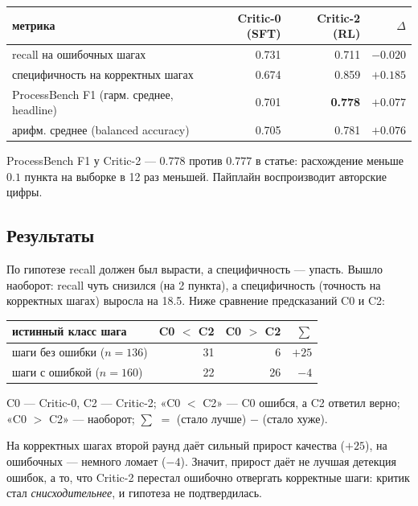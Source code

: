 \documentclass[11pt,a4paper]{article}
\begin{document}
\begin{center}
\begin{tabular}{lrrr}
\toprule
метрика & Critic-0 (SFT) & Critic-2 (RL) & $\Delta$ \\
\midrule
recall на ошибочных шагах             & 0.731 & 0.711          & $-0.020$ \\
специфичность на корректных шагах     & 0.674 & 0.859          & $+0.185$ \\
ProcessBench F1 (гарм. среднее, headline) & 0.701 & \textbf{0.778} & $+0.077$ \\
арифм. среднее (balanced accuracy)    & 0.705 & 0.781          & $+0.076$ \\
\bottomrule
\end{tabular}
\end{center}

ProcessBench F1 у Critic-2 — $0.778$ против $0.777$ в статье: расхождение меньше $0.1$ пункта на выборке в 12 раз меньшей. Пайплайн воспроизводит авторские цифры.

\subsection*{Результаты}

По гипотезе recall должен был вырасти, а специфичность — упасть. Вышло наоборот: recall чуть снизился (на 2 пункта), а специфичность (точность на корректных шагах) выросла на 18.5. Ниже сравнение предсказаний C0 и C2:

\begin{center}
\begin{tabular}{lrrr}
\toprule
истинный класс шага & C0 $<$ C2 & C0 $>$ C2 & $\sum$ \\
\midrule
шаги без ошибки ($n{=}136$) & 31 & 6  & $+25$ \\
шаги с ошибкой ($n{=}160$)  & 22 & 26 & $-4$  \\
\bottomrule
\end{tabular}
\end{center}

\smallskip
{\small C0 — Critic-0, C2 — Critic-2; «C0 $<$ C2» — C0 ошибся, а C2 ответил верно; «C0 $>$ C2» — наоборот; $\sum$ $=$ (стало лучше) $-$ (стало хуже).}

\smallskip
На корректных шагах второй раунд даёт сильный прирост качества ($+25$), на ошибочных — немного ломает ($-4$). Значит, прирост даёт не лучшая детекция ошибок, а то, что Critic-2 перестал ошибочно отвергать корректные шаги: критик стал \textit{снисходительнее}, и гипотеза не подтвердилась.
\end{document}
